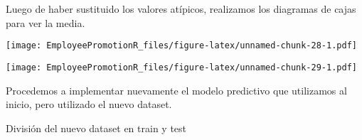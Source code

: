 \documentclass[
]{article}
\newenvironment{Shaded}{\begin{snugshade}}{\end{snugshade}}
\newcommand{\AttributeTok}[1]{\textcolor[rgb]{0.77,0.63,0.00}{#1}}
\newcommand{\ConstantTok}[1]{\textcolor[rgb]{0.00,0.00,0.00}{#1}}
\newcommand{\DecValTok}[1]{\textcolor[rgb]{0.00,0.00,0.81}{#1}}
\newcommand{\FunctionTok}[1]{\textcolor[rgb]{0.00,0.00,0.00}{#1}}
\newcommand{\NormalTok}[1]{#1}
\newcommand{\OtherTok}[1]{\textcolor[rgb]{0.56,0.35,0.01}{#1}}
\newcommand{\SpecialCharTok}[1]{\textcolor[rgb]{0.00,0.00,0.00}{#1}}
\newcommand{\StringTok}[1]{\textcolor[rgb]{0.31,0.60,0.02}{#1}}
\begin{document}
Luego de haber sustituido los valores atípicos, realizamos los diagramas
de cajas para ver la media.

\begin{Shaded}
\end{Shaded}

\texttt{[image: EmployeePromotionR\_files/figure-latex/unnamed-chunk-28-1.pdf]}

\begin{Shaded}
\end{Shaded}

\texttt{[image: EmployeePromotionR\_files/figure-latex/unnamed-chunk-29-1.pdf]}

Procedemos a implementar nuevamente el modelo predictivo que utilizamos
al inicio, pero utilizado el nuevo dataset.

División del nuevo dataset en train y test

\begin{Shaded}
\end{Shaded}
\end{document}
